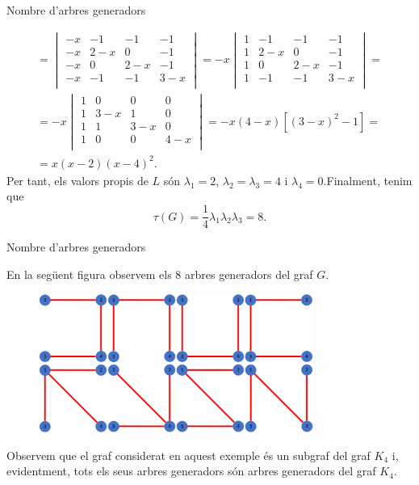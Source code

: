 \documentclass{beamer}
\begin{document}
\begin{frame}{Nombre d'arbres generadors}
    \begin{exampleblock}{}
           \begin{multline*}
               =\begin{vmatrix}
        -x & -1 & -1 & -1\\
       -x & 2-x & 0 & -1\\
       -x & 0 & 2-x & -1\\
       -x & -1 & -1 & 3-x\\
    \end{vmatrix}=-x\begin{vmatrix}
        1 & -1 & -1 & -1\\
        1 & 2-x & 0 & -1\\
        1 & 0 & 2-x & -1\\
        1 & -1 & -1 & 3-x\\
    \end{vmatrix}=\\=-x\begin{vmatrix}
        1 & 0 & 0 & 0\\
        1 & 3-x & 1 & 0\\
        1 & 1 & 3-x & 0\\
        1 & 0 & 0 & 4-x\\
    \end{vmatrix}=-x(4-x)[(3-x)^2-1]=\\=x(x-2)(x-4)^2.
            \end{multline*}\pause
        Per tant, els valors propis de $L$ són $\lambda_1=2$, $\lambda_2=\lambda_3=4$ i $\lambda_4=0$.\pause\space  Finalment, tenim que $$\tau(G)=\frac{1}{4}\lambda_1\lambda_2\lambda_3=8.$$
    \end{exampleblock}
\end{frame}
 \begin{frame}{Nombre d'arbres generadors}
     \begin{exampleblock}{}
       En la següent figura observem els 8 arbres generadors del graf $G$.
       \begin{figure}[ht]
           \centering
           \includegraphics[width=9cm]{imatges/graf1_8.jpg}
       \end{figure}\pause
       Observem que el graf considerat en aquest exemple és un subgraf del graf $K_4$ i, evidentment, tots els seus arbres generadors són arbres generadors del graf $K_4$.
    \end{exampleblock}
 \end{frame}  
\end{document}

